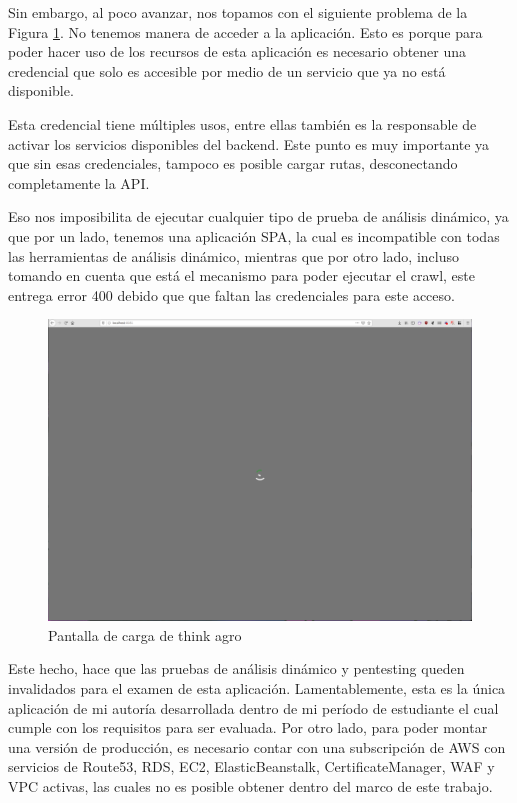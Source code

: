 Sin embargo, al poco avanzar, nos topamos con el siguiente problema de la Figura \ref{asd}. No tenemos manera de acceder a la aplicación. Esto es porque para poder hacer uso de los recursos de esta aplicación es necesario obtener una credencial que solo es accesible por medio de un servicio que ya no está disponible.

Esta credencial tiene múltiples usos, entre ellas también es la responsable de activar los servicios disponibles del backend. Este punto es muy importante ya que sin esas credenciales, tampoco es posible cargar rutas, desconectando completamente la API. 

Eso nos imposibilita de ejecutar cualquier tipo de prueba de análisis dinámico, ya que por un lado, tenemos una aplicación SPA, la cual es incompatible con todas las herramientas de análisis dinámico, mientras que por otro lado, incluso tomando en cuenta que está el mecanismo para poder ejecutar el crawl, este entrega error 400 debido que que faltan las credenciales para este acceso.

\begin{figure}
	\centering
	\includegraphics[width=.9\textwidth]{fragments/thinkno.png}
    \caption{ Pantalla de carga de think agro}
    \label{asd}
\end{figure}

Este hecho, hace que las pruebas de análisis dinámico y pentesting queden invalidados para el examen de esta aplicación. Lamentablemente, esta es la única aplicación de mi autoría desarrollada dentro de mi período de estudiante el cual cumple con los requisitos para ser evaluada. Por otro lado, para poder montar una versión de producción, es necesario contar con una subscripción de AWS con servicios de Route53, RDS, EC2, ElasticBeanstalk, CertificateManager, WAF y VPC activas, las cuales no es posible obtener dentro del marco de este trabajo.

